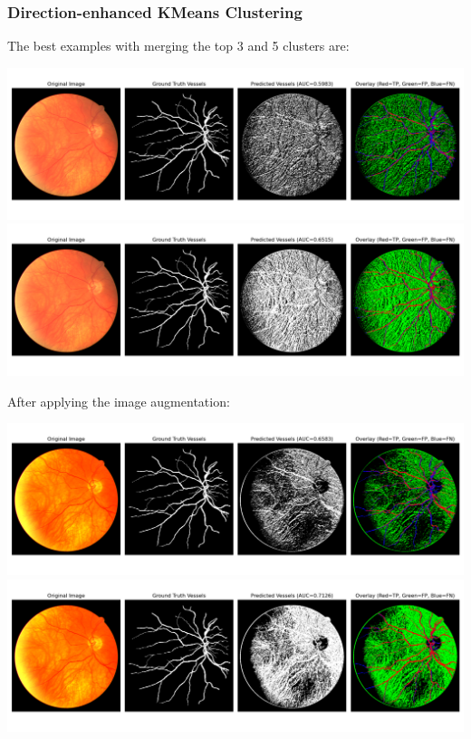 \documentclass[12pt,letterpaper]{article}
\begin{document}
\subsubsection{Direction-enhanced KMeans Clustering}
The best examples with merging the top 3 and 5 clusters are: 
\begin{center}
    \includegraphics[scale=0.35]{Figures/5 Directed (Merge 3 Clusters).png}
    \includegraphics[scale=0.35]{Figures/5 Directed (Merge 5 Clusters).png}
\end{center}
After applying the image augmentation:
\begin{center}
    \includegraphics[scale=0.35]{Figures/6 Directed (Merge 3 Clusters).png}
    \includegraphics[scale=0.35]{Figures/6 Directed (Merge 5 Clusters).png}
\end{center}
\end{document}
